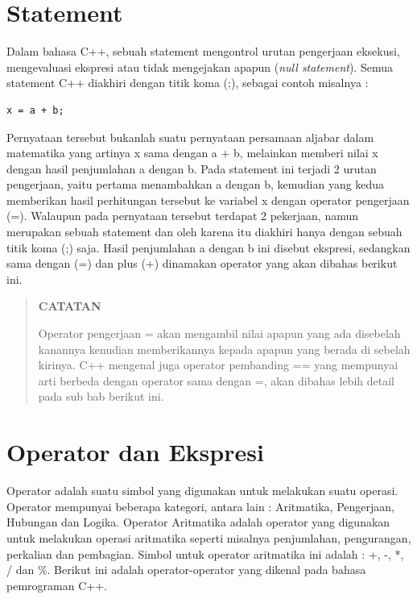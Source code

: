 \section{Statement}\label{statement}

Dalam bahasa C++, sebuah statement mengontrol urutan pengerjaan
eksekusi, mengevaluasi ekspresi atau tidak mengejakan apapun (\emph{null
statement}). Semua statement C++ diakhiri dengan titik koma (;), sebagai
contoh misalnya :

\begin{verbatim}
x = a + b;
\end{verbatim}

Pernyataan tersebut bukanlah suatu pernyataan persamaan aljabar dalam
matematika yang artinya x sama dengan a + b, melainkan memberi nilai x
dengan hasil penjumlahan a dengan b. Pada statement ini terjadi 2 urutan
pengerjaan, yaitu pertama menambahkan a dengan b, kemudian yang kedua
memberikan hasil perhitungan tersebut ke variabel x dengan operator
pengerjaan (=). Walaupun pada pernyataan tersebut terdapat 2 pekerjaan,
namun merupakan sebuah statement dan oleh karena itu diakhiri hanya
dengan sebuah titik koma (;) saja. Hasil penjumlahan a dengan b ini
disebut ekspresi, sedangkan sama dengan (=) dan plus (+) dinamakan
operator yang akan dibahas berikut ini.

\begin{quotation}
	 \textbf{CATATAN}
	 
	 Operator pengerjaan = akan mengambil nilai apapun yang ada disebelah
	 kanannya kenudian memberikannya kepada apapun yang berada di sebelah
	 kirinya. C++ mengenal juga operator pembanding == yang mempunyai
	 arti berbeda dengan operator sama dengan =, akan dibahas lebih
	 detail pada sub bab berikut ini.
\end{quotation}


\section{Operator dan Ekspresi}\label{operator-dan-ekspresi}

Operator adalah suatu simbol yang digunakan untuk melakukan suatu
operasi. Operator mempunyai beberapa kategori, antara lain : Aritmatika,
Pengerjaan, Hubungan dan Logika. Operator Aritmatika adalah operator
yang digunakan untuk melakukan operasi aritmatika seperti misalnya
penjumlahan, pengurangan, perkalian dan pembagian. Simbol untuk operator
aritmatika ini adalah : +, -, *, / dan \%. Berikut ini adalah
operator-operator yang dikenal pada bahasa pemrograman C++.

